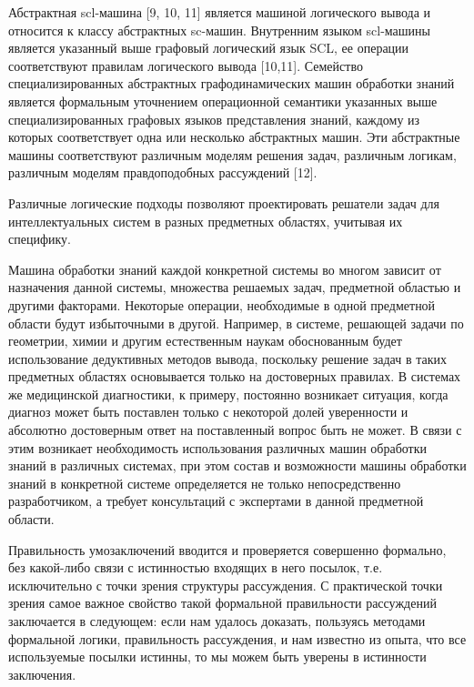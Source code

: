 Абстрактная scl-машина [9, 10, 11] является машиной логического вывода и относится к классу абстрактных sc-машин. Внутренним языком scl-машины является указанный выше графовый логический язык SCL, ее операции соответствуют правилам логического вывода [10,11]. Семейство специализированных абстрактных графодинамических машин обработки знаний является формальным уточнением операционной семантики указанных выше специализированных графовых языков представления знаний, каждому из которых соответствует одна или несколько абстрактных машин. Эти абстрактные машины соответствуют различным моделям решения задач, различным логикам, различным моделям правдоподобных рассуждений [12].

Различные логические подходы позволяют проектировать решатели задач для интеллектуальных систем в разных предметных областях, учитывая их специфику.

Машина обработки знаний каждой конкретной системы во многом зависит от назначения данной системы, множества решаемых задач, предметной областью и другими факторами. Некоторые операции, необходимые в одной предметной области будут избыточными в другой. Например, в системе, решающей задачи по геометрии, химии и другим естественным наукам обоснованным будет использование дедуктивных методов вывода, поскольку решение задач в таких предметных областях основывается только на достоверных правилах. В системах же медицинской диагностики, к примеру, постоянно возникает ситуация, когда диагноз может быть поставлен только с некоторой долей уверенности и абсолютно достоверным ответ на поставленный вопрос быть не может. В связи с этим возникает необходимость использования различных машин обработки знаний в различных системах, при этом состав и возможности машины обработки знаний в конкретной системе определяется не только непосредственно разработчиком, а требует консультаций с экспертами в данной предметной области.

Правильность умозаключений вводится и проверяется совершенно формально, без какой-либо связи с истинностью входящих в него посылок, т.е. исключительно с точки зрения структуры рассуждения. С практической точки зрения самое важное свойство такой формальной правильности рассуждений заключается в следующем: если нам удалось доказать, пользуясь методами формальной логики, правильность рассуждения, и нам известно из опыта, что все используемые посылки истинны, то мы можем быть уверены в истинности заключения. 

